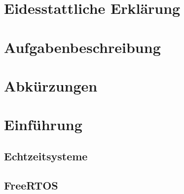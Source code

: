 \documentclass{scrartcl}
\begin{document}
	\begin{titlepage}
		
	\end{titlepage}
	\clearpage 
	\section*{Eidesstattliche Erklärung}
		
		\clearpage
	\section*{Aufgabenbeschreibung}
		
		\clearpage
	\tableofcontents
		\clearpage
	\section*{Abkürzungen}
		
		\clearpage
	\section{Einführung}
		
		\clearpage
		\subsection{Echtzeitsysteme}
			
		\subsection{FreeRTOS}
			
		\clearpage
	\listoffigures
		\clearpage
	\listoftables
		\clearpage
\end{document}
